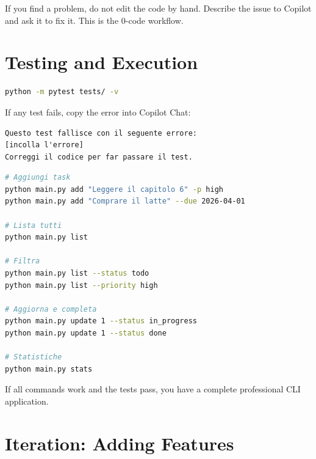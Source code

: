 \begin{warnbox}
If you find a problem, do not edit the code by hand. Describe the issue to Copilot and ask it to fix it. This is the 0-code workflow.
\end{warnbox}

\section{Testing and Execution}

\begin{praticabox}[title={Hands-on --- Testing}]
\begin{lstlisting}[language=bash]
python -m pytest tests/ -v
\end{lstlisting}
If any test fails, copy the error into Copilot Chat:
\begin{lstlisting}[language={}]
Questo test fallisce con il seguente errore:
[incolla l'errore]
Correggi il codice per far passare il test.
\end{lstlisting}
\end{praticabox}

\begin{praticabox}[title={Hands-on --- Using the application}]
\begin{lstlisting}[language=bash]
# Aggiungi task
python main.py add "Leggere il capitolo 6" -p high
python main.py add "Comprare il latte" --due 2026-04-01

# Lista tutti
python main.py list

# Filtra
python main.py list --status todo
python main.py list --priority high

# Aggiorna e completa
python main.py update 1 --status in_progress
python main.py update 1 --status done

# Statistiche
python main.py stats
\end{lstlisting}
\end{praticabox}

\begin{checkpointbox}
If all commands work and the tests pass, you have a complete professional CLI application.
\end{checkpointbox}

\section{Iteration: Adding Features}

